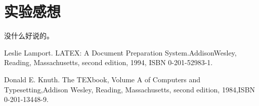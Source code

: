 \documentclass[a4paper,12pt]{report}
\begin{document}
\chapter{实验感想}
\begin{spacing}{1.5}
	没什么好说的。
\end{spacing}


\begin{thebibliography}{99}
\songti {} 	
	Leslie Lamport. LATEX: A Document Preparation System.AddisonWesley, Reading, Massachusetts, second edition, 1994, ISBN 0-201-52983-1.
	
	Donald E. Knuth. The TEXbook, Volume A of Computers and Typesetting,Addison Wesley, Reading, Massachusetts, second edition, 1984,ISBN 0-201-13448-9.

	
\end{thebibliography}

\end{document}
